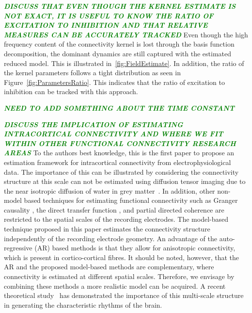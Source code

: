 \documentclass[12pt]{iopart}
\newcommand{\omg}[1]{\textsf{\emph{\textbf{\textcolor{green}{#1}}}}}
\begin{document}
\omg{DISCUSS THAT EVEN THOUGH THE KERNEL ESTIMATE IS NOT EXACT, IT IS USEFUL TO KNOW THE RATIO OF EXCITATION TO INHIBITION AND THAT RELATIVE MEASURES CAN BE ACCURATELY TRACKED}
Even though the high frequency content of the connectivity kernel is lost through the basis function decomposition, the dominant dynamics are still captured with the estimated reduced model. This is illustrated in~\ref{fig:FieldEstimate}. In addition, the ratio of the kernel parameters follows a tight distribution as seen in Figure~\ref{fig:ParametersRatio}. This indicates that the ratio of excitation to inhibition can be tracked with this approach. 

\omg{NEED TO ADD SOMETHING ABOUT THE TIME CONSTANT }

\omg{DISCUSS THE IMPLICATION OF ESTIMATING INTRACORTICAL CONNECTIVITY AND WHERE WE FIT WITHIN OTHER FUNCTIONAL CONNECTIVITY RESEARCH AREAS}
To the authors best knowledge, this is the first paper to propose an estimation framework for intracortical connectivity from electrophysiological data. The importance of this can be illustrated by considering the connectivity structure at this scale can not be estimated using diffusion tensor imaging due to the near isotropic diffusion of water in grey matter~\cite{Assaf2008}. In addition, other non-model based techniques for estimating functional connectivity such as Granger causality \cite{Hesse2003}, the direct transfer function \cite{Kaminski1991}, and partial directed coherence \cite{Sameshima1999} are restricted to the spatial scales of the recording electrodes. The model-based technique proposed in this paper estimates the connectivity structure independently of the recording electrode geometry. An advantage of the auto-regressive (AR) based methods is that they allow for anisotropic connectivity, which is present in cortico-cortical fibres. It should be noted, however, that the AR and the proposed model-based methods are complementary, where connectivity is estimated at different spatial scales. Therefore, we envisage by combining these methods a more realistic model can be acquired. A recent theoretical study~\cite{Jirsa2009} has demonstrated the importance of this multi-scale structure in generating the characteristic rhythms of the brain.
\end{document}
